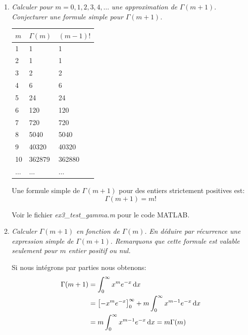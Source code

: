 \documentclass[a4paper,10pt]{article}
\begin{document}
\begin{enumerate}
    \item \emph{Calculer pour $m = 0, 1, 2, 3, 4, \dots$ une approximation de $\Gamma(m + 1)$.
    Conjecturer une formule simple pour $\Gamma(m + 1)$.}

{
\renewcommand{\arraystretch}{1.2}
\begin{center}
\begin{tabular}{|l|l|l|}\hline

$m$      & $\Gamma(m)$  & $(m - 1)!$    \\\hline
1        & 1            & 1             \\\hline
2        & 1            & 1             \\\hline
3        & 2            & 2             \\\hline
4        & 6            & 6             \\\hline
5        & 24           & 24            \\\hline
6        & 120          & 120           \\\hline
7        & 720          & 720           \\\hline
8        & 5040         & 5040          \\\hline
9        & 40320        & 40320         \\\hline
10       & 362879       & 362880        \\\hline
$\dots$  & $\dots$     & $\dots$        \\\hline

\end{tabular}
\end{center}
}

Une formule simple de $\Gamma(m + 1)$ pour des entiers strictement positives est:
\[
    \Gamma(m + 1) = m!
\]

    Voir  le fichier \emph{ex3\_test\_gamma.m} pour le code MATLAB.

    \item \emph{Calculer $\Gamma(m + 1)$ en fonction de $\Gamma(m)$. En déduire par
    récurrence une expression simple de $\Gamma(m + 1)$. Remarquons que cette
    formule est valable seulement pour $m$ entier positif ou nul.}

    Si nous intégrons par parties nous obtenons:
\begin{align*}
    \Gamma(m + 1) & = \int_0^{\infty} x^m e^{-x} \,\mathrm{d} x \\
    & = \left[-x^m e^{-x}\right]_0^{\infty} + m \int_0^{\infty} x^{m - 1} e^{-x} \,\mathrm{d} x \\
    & = m \int_0^{\infty} x^{m - 1} e^{-x} \,\mathrm{d} x = m \Gamma(m)
\end{align*}


\end{enumerate}
\end{document}
